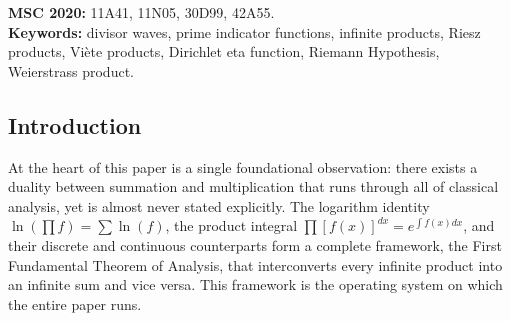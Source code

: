 \documentclass{article}
\begin{document}
\begin{abstract}
We present a unifying sum-product duality underlying classical analysis, connecting the Riemann integral, the product integral, and the logarithm identity $\ln(\prod f) = \sum \ln(f)$, and demonstrate that this framework applied systematically to divisor waves built from the Weierstrass product for sine naturally encodes the structure of prime numbers through zeros, reproduces Viète's formula for $\pi$, and recovers the Euler product for the Dirichlet eta function $\eta(s)$ term-for-term. The four identities of this framework, which we call the First Fundamental Theorem of Analysis, underpin the entirety of the constructions in this paper yet are rarely presented together even in advanced mathematical texts. Applying the framework to infinite products of divisor waves $|\sin(\pi z/k)|$ yields $a(z)$, a function encoding all integer divisors through its zero set, and its Weierstrass-factored counterpart $b(z)$, which vanishes precisely at composite integers and is nonzero at primes. Factorial normalization produces the binary prime indicator $B(z)$. Combining these with Riesz products, Viète-type products, and nested-root identities, all unified under the sum-product duality, produces a hierarchy of prime-sieving functions culminating in $S_1(z)$, a holomorphic divisor wave product satisfying $S_1(s) = \eta(s)$ term-for-term over the primes. The connection to the Riemann Hypothesis is discussed through the critical strip structure of $\eta(s)$.
\end{abstract}

\medskip
\noindent\textbf{MSC 2020:} 11A41, 11N05, 30D99, 42A55.\\
\textbf{Keywords:} divisor waves, prime indicator functions, infinite products, Riesz products, Viète products, Dirichlet eta function, Riemann Hypothesis, Weierstrass product.

\medskip

\subsection{Introduction}
At the heart of this paper is a single foundational observation: there exists a duality between summation and multiplication that runs through all of classical analysis, yet is almost never stated explicitly. The logarithm identity $\ln(\prod f) = \sum \ln(f)$, the product integral $\prod[f(x)]^{dx} = e^{\int f(x)dx}$, and their discrete and continuous counterparts form a complete framework, the First Fundamental Theorem of Analysis, that interconverts every infinite product into an infinite sum and vice versa. This framework is the operating system on which the entire paper runs.
\end{document}
